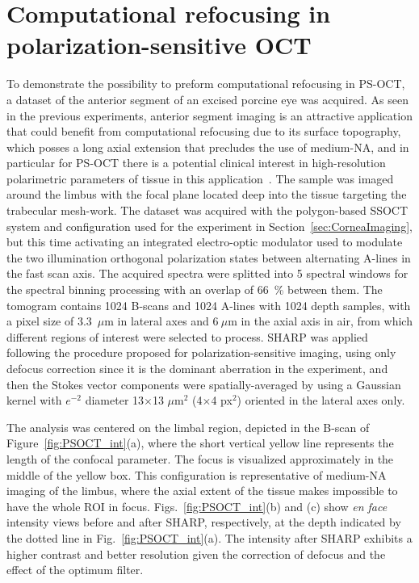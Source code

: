 \section{Computational refocusing in polarization-sensitive OCT}

To demonstrate the possibility to preform computational refocusing in PS-OCT, a dataset of the anterior segment of an excised porcine eye was acquired. As seen in the previous experiments, anterior segment imaging is an attractive application that could benefit from computational refocusing due to its surface topography, which posses a long axial extension that precludes the use of medium-NA, and in particular for PS-OCT there is a potential clinical interest in high-resolution polarimetric parameters of tissue in this application~\cite{Li2020_Vectorial}. The sample was imaged around the limbus with the focal plane located deep into the tissue targeting the trabecular mesh-work. The dataset was acquired with the polygon-based SSOCT system and configuration used for the experiment in Section~\ref{sec:CorneaImaging}, but this time activating an integrated electro-optic modulator used to modulate the two illumination orthogonal polarization states between alternating A-lines in the fast scan axis. The acquired spectra were splitted into 5 spectral windows for the spectral binning processing with an overlap of 66~\% between them. The tomogram contains 1024 B-scans and 1024 A-lines with 1024 depth samples, with a pixel size of 3.3~$\mu$m in lateral axes and $6~\mu$m in the axial axis in air, from which different regions of interest were selected to process. SHARP was applied following the procedure proposed for polarization-sensitive imaging, using only defocus correction since it is the dominant aberration in the experiment, and then the Stokes vector components were spatially-averaged by using a Gaussian kernel with $e^{-2}$ diameter 13$\times$13 $\mu$m$^2$ (4$\times$4 px$^2$) oriented in the lateral axes only.

The analysis was centered on the limbal region, depicted in the B-scan of Figure~\ref{fig:PSOCT_int}(a), where the short vertical yellow line represents the length of the confocal parameter. The focus is visualized approximately in the middle of the yellow box. This configuration is representative of medium-NA imaging of the limbus, where the axial extent of the tissue makes impossible to have the whole ROI in focus. Figs.~\ref{fig:PSOCT_int}(b) and (c) show \textit{en face} intensity views before and after SHARP, respectively, at the depth indicated by the dotted line in Fig.~\ref{fig:PSOCT_int}(a). The intensity after SHARP exhibits a higher contrast and better resolution given the correction of defocus and the effect of the optimum filter.

